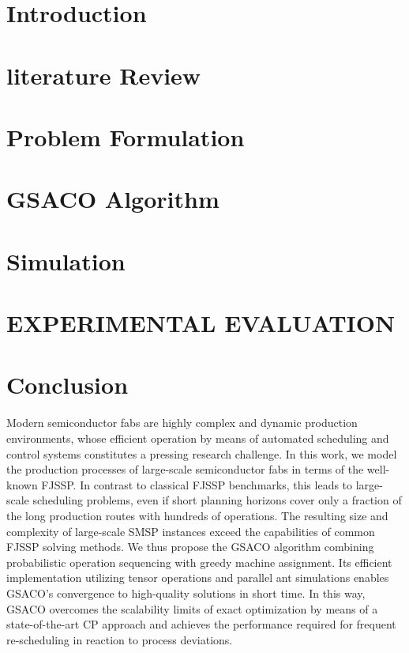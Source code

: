\documentclass[runningheads]{llncs}
\begin{document}
\section{Introduction}
\label{sec:introduction}


\section{literature Review}
\label{sec:lit_rev}


\section{Problem Formulation}
\label{sec:problem_f}


\section{GSACO Algorithm}
\label{sec:gsaco}


\section{Simulation}
\label{sec:sim}


\section{\uppercase{Experimental Evaluation}}
\label{sec:results}



\section{Conclusion}
\label{sec:conclusion}

Modern semiconductor fabs are highly complex and dynamic production
environments, whose efficient operation by means of automated scheduling
and control systems constitutes a pressing research challenge.
In this work, we model the production processes of large-scale
semiconductor fabs in terms of the well-known FJSSP.
In contrast to classical FJSSP benchmarks,
this leads to large-scale scheduling problems,
even if short planning horizons cover only a fraction of the long
production routes with hundreds of operations.
The resulting size and complexity of large-scale SMSP instances
exceed the capabilities of common FJSSP solving methods.
We thus propose the GSACO algorithm combining probabilistic
operation sequencing with greedy machine assignment.
Its efficient implementation utilizing tensor operations and
parallel ant simulations enables GSACO's convergence to high-quality
solutions in short time.
In this way, GSACO overcomes the scalability limits of
exact optimization by means of a state-of-the-art CP approach
and achieves the performance required for frequent re-scheduling
in reaction to process deviations. %
\end{document}

